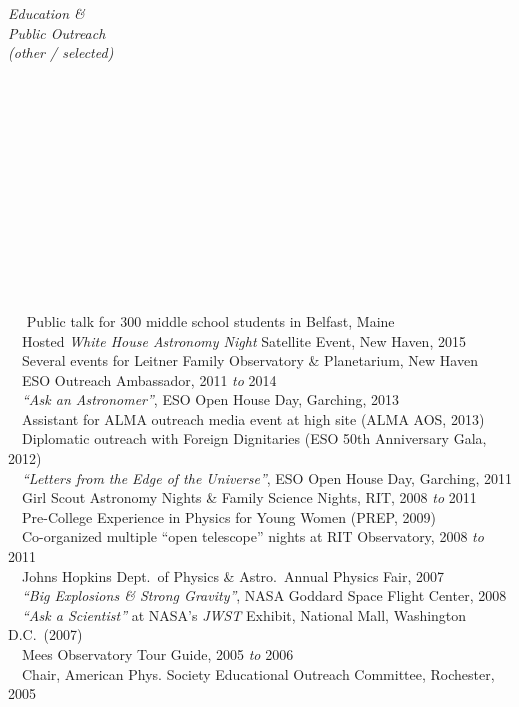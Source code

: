 \documentclass[11pt]{article}
\begin{document}
\vspace{4mm}




\hspace{2.5mm} \parbox{1.5in}{{\it Education \& \\ Public Outreach \\ (other / selected) \\\\\\\\\\\\\\\\\\\\\\\\\\}} \parbox{5.15in}{
\textbullet~~ Public talk for 300 middle school students in Belfast, Maine\\
\textbullet~~Hosted {\it White House Astronomy Night} Satellite Event, New Haven, 2015
\\ 
\textbullet~~Several events for Leitner Family Observatory \& Planetarium, New Haven
\\ 
\textbullet~~ESO Outreach Ambassador, 2011 {\it to} 2014 
\\\textbullet~~{\it ``Ask an Astronomer''}, ESO Open House Day, Garching, 2013
\\\textbullet~~Assistant for ALMA outreach media event at high site (ALMA AOS, 2013)
\\\textbullet~~Diplomatic outreach with Foreign Dignitaries (ESO 50th Anniversary Gala, 2012)
\\ \textbullet~~{\it ``Letters from the Edge of the Universe''}, ESO Open House Day, Garching, 2011
\\ \textbullet~~Girl Scout Astronomy Nights \& Family Science Nights, RIT, 2008 {\it to} 2011
\\ \textbullet~~Pre-College Experience in Physics for Young Women (PREP, 2009)
\\ \textbullet~~Co-organized multiple ``open telescope'' nights at RIT Observatory, 2008 {\it to} 2011
\\ \textbullet~~Johns Hopkins Dept.~of Physics \& Astro.~Annual Physics Fair, 2007
\\ \textbullet~~{\it ``Big Explosions \& Strong Gravity''}, NASA Goddard Space Flight Center, 2008 
\\ \textbullet~~{\it ``Ask a Scientist''} at NASA's {\it JWST} Exhibit, National Mall, Washington D.C.~(2007)
\\ \textbullet~~Mees Observatory Tour Guide, 2005 {\it to} 2006
\\ \textbullet~~Chair, American Phys. Society Educational Outreach Committee, Rochester, 2005 
}
\end{document}
